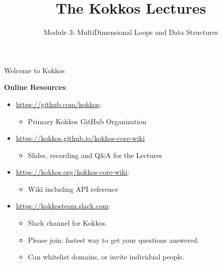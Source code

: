 
\def\sandid{SAND2020-7908 PE}

\title{The Kokkos Lectures}

\author{Module 3: MultiDimensional Loops and Data Structures}




\shortfalse
\mediumtrue
\fulltrue
\notoverviewtrue



% 

\begin{frame}
	\titlepage
\end{frame}

\begin{frame}{Welcome to Kokkos}

\textbf{Online Resources}:

\begin{itemize}
        \item \url{https://github.com/kokkos}:
                \begin{itemize}
                        \item Primary Kokkos GitHub Organization
                \end{itemize}
        \item \url{https://kokkos.github.io/kokkos-core-wiki}
                \begin{itemize}
			\item{Slides, recording and Q\&A for the Lectures}
                \end{itemize}
        \item \url{https://kokkos.org/kokkos-core-wiki}:
                \begin{itemize}
                        \item Wiki including API reference
                \end{itemize}
        \item \url{https://kokkosteam.slack.com}:
                \begin{itemize}
                        \item Slack channel for Kokkos.
                        \item Please join: fastest way to get your questions answered.
                        \item Can whitelist domains, or invite individual people.
                \end{itemize}
\end{itemize}

\end{frame}


